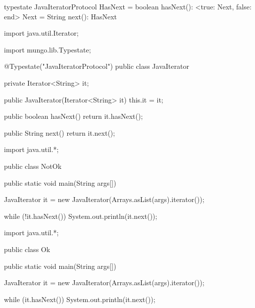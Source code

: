 \begin{code}
typestate JavaIteratorProtocol {
  HasNext = {
    boolean hasNext(): <true: Next, false: end>
  }
  Next = {
    String next(): HasNext
  }
}\end{code}

\begin{code}
import java.util.Iterator;

import mungo.lib.Typestate;

@Typestate("JavaIteratorProtocol")
public class JavaIterator {

  private Iterator<String> it;

  public JavaIterator(Iterator<String> it) {
    this.it = it;
  }

  public boolean hasNext() {
    return it.hasNext();
  }

  public String next() {
    return it.next();
  }

}\end{code}

\begin{code}
import java.util.*;

public class NotOk {
  public static void main(String args[]) {
    JavaIterator it = new JavaIterator(Arrays.asList(args).iterator());

    while (!it.hasNext()) {
      System.out.println(it.next());
    }
  }
}\end{code}

\begin{code}
import java.util.*;

public class Ok {
  public static void main(String args[]) {
    JavaIterator it = new JavaIterator(Arrays.asList(args).iterator());

    while (it.hasNext()) {
      System.out.println(it.next());
    }
  }
}\end{code}

